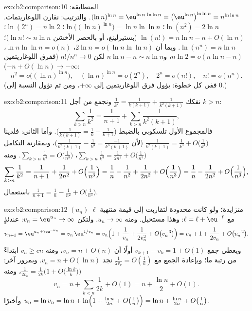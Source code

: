 \begin{solution}{exo:b2:comparison:10}
المتطابقة: $(\ln n)^{\ln n} = \eu^{\ln n\,\ln\ln n} =
\bigl(\eu^{\ln n}\bigr)^{\ln\ln n} = n^{\ln\ln n}$. والترتيب:
نقارن اللوغاريتمات. $\ln(n^2) = 2\ln n$؛ $\ln\bigl((\ln
n)^{\ln n}\bigr) = \ln n\ln\ln n$؛ $\ln(2^n) = n\ln2$؛
$\ln(n!) = n\ln n - n + O(\ln n)$ (بستيرلينغ، أو بالحصر الأخشن
$\ln n! \sim n\ln n$)؛ $\ln(n^n) = n\ln n$. وبما أن
$2\ln n = o(\ln n\ln\ln n)$، $\ln n\ln\ln n = o(n)$، $n\ln 2 =
o(n\ln n - n)$، و$n \ln n - n \sim n\ln n$ لكن $n! / n^n \to
0$ (ففرق اللوغاريتمين $-n + O(\ln n) \to -\infty$):
\[
n^2 = o\bigl((\ln n)^{\ln n}\bigr),\quad
(\ln n)^{\ln n} = o(2^n),\quad
2^n = o(n!),\quad
n! = o(n^n).
\]
(ففي كل خطوة: يؤول فرق اللوغاريتمين إلى
$+\infty$، ومن ثم تؤول النسبة إلى $0$.)
\end{solution}

\begin{solution}{exo:b2:comparison:11}
نفكك $\frac1{k^2} = \frac1{k(k+1)} + \frac1{k^2(k+1)}$ ونجمع
من أجل $k > n$:
\[
\sum_{k>n}\frac1{k^2} = \frac1{n+1} +
\sum_{k>n}\frac{1}{k^2(k+1)} ,
\]
فالمجموع الأول تلسكوبي بالضبط ($\frac1{k(k+1)} = \frac1k -
\frac1{k+1}$). وأما الثاني: فلدينا $\frac{1}{k^2(k+1)} = \frac1{k^3}
+ O\bigl(\frac1{k^4}\bigr)$ (لأن $\frac{1}{k^2(k+1)} -
\frac1{k^3} = \frac{-1}{k^3(k+1)}$)، وبمقارنة
التكامل $\sum_{k>n}\frac1{k^3} = \frac1{2n^2} +
O\bigl(\frac1{n^3}\bigr)$، $\sum_{k>n}\frac1{k^4} =
O\bigl(\frac1{n^3}\bigr)$. ومنه
\[
\sum_{k>n}\frac1{k^2}
= \frac1{n+1} + \frac{1}{2n^2} + O\Bigl(\frac1{n^3}\Bigr)
= \frac1n - \frac1{n^2} + \frac{1}{2n^2} +
O\Bigl(\frac1{n^3}\Bigr)
= \frac1n - \frac{1}{2n^2} + O\Bigl(\frac1{n^3}\Bigr),
\]
باستعمال $\frac1{n+1} = \frac1n - \frac1{n^2} +
O\bigl(\frac1{n^3}\bigr)$.
\end{solution}

\begin{solution}{exo:b2:comparison:12}
$(u_n)$ متزايدة؛ ولو كانت محدودة لتقاربت إلى قيمة
منتهية $\ell$ مع $\ell = \ell + \eu^{-\ell}$: وهذا مستحيل. ومنه
$u_n \to \infty$. ولتكن $v_n = \eu^{u_n} \to \infty$: عندئذٍ
\[
v_{n+1} = \eu^{u_n + \eu^{-u_n}} = v_n\,\eu^{1/v_n}
= v_n\Bigl(1 + \frac1{v_n} + \frac1{2v_n^2} +
O\bigl(v_n^{-3}\bigr)\Bigr)
= v_n + 1 + \frac{1}{2v_n} + O\bigl(v_n^{-2}\bigr).
\]
ويعطي جمع $v_{k+1} - v_k = 1 + O(1)$ أولًا أن $v_n = n +
O(n)$، ومنه $v_n \geq cn$ ابتداءً من رتبة ما؛ وبإعادة الجمع مع
$\frac1{2v_k} = O(\frac1k)$ نجد $v_n = n + O(\ln n)$. وبمرور آخر:
$\frac{1}{2v_k} = \frac{1}{2k}\bigl(1 +
O\bigl(\tfrac{\ln k}k\bigr)\bigr)$، ومنه
\[
v_n = n + \sum_{k<n}\frac1{2k} + O(1) = n + \frac{\ln n}2 +
O(1).
\]
وأخيرًا $u_n = \ln v_n = \ln n + \ln\Bigl(1 + \frac{\ln n}{2n} +
O\bigl(\tfrac1n\bigr)\Bigr) = \ln n + \frac{\ln n}{2n} +
O\bigl(\tfrac1n\bigr)$.
\end{solution}

